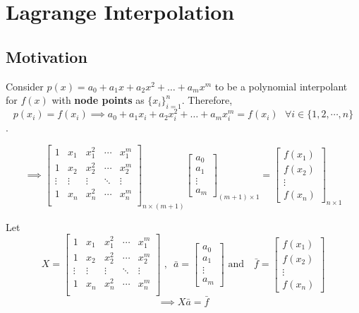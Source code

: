 \documentclass[
]{book}
\begin{document}
\hypertarget{lagrange-interpolation}{%
\section{Lagrange Interpolation}\label{lagrange-interpolation}}

\hypertarget{motivation}{%
\subsection{Motivation}\label{motivation}}

Consider \(p(x) = a_0+a_1x+a_2x^2+\dots+ a_mx^m\) to be a polynomial interpolant for \(f(x)\) with \textbf{node points} as \(\{x_i\}_{i=1}^n\). Therefore,
\[p(x_i)=f(x_i) \implies a_0+a_1x_i+a_2x_i^2+\dots+ a_mx_i^m = f(x_i) \ \ \ \forall i \in \{1,2,\cdots, n\}\].

\begin{equation}
\implies \begin{bmatrix}
1 & x_1 & x_1^2 & \cdots & x_1^m\\
1 & x_2 & x_2^2 & \cdots & x_2^m\\
\vdots & \vdots & \vdots & \ddots & \vdots \\
1 & x_n & x_n^2 & \cdots & x_n^m\\
\end{bmatrix}_{n \times(m+1)} \begin{bmatrix}a_0\\a_1\\ \vdots \\a_m \end{bmatrix}_{(m+1) \times 1}  = \begin{bmatrix} f(x_1)\\f(x_2)\\ \vdots \\f(x_n) \end{bmatrix}_{n\times 1}
\end{equation}

Let \[X = \begin{bmatrix}
1 & x_1 & x_1^2 & \cdots & x_1^m\\
1 & x_2 & x_2^2 & \cdots & x_2^m\\
\vdots & \vdots & \vdots & \ddots & \vdots \\
1 & x_n & x_n^2 & \cdots & x_n^m\\
\end{bmatrix}\text{ ,} \ \  \ \bar{a} = \begin{bmatrix}a_0\\a_1\\ \vdots \\a_m \end{bmatrix}  \text{ and } \ \ \ \bar{f}=  \begin{bmatrix} f(x_1)\\f(x_2)\\ \vdots \\f(x_n) \end{bmatrix}\]
\[\implies X\bar{a} = \bar{f}\]
\end{document}
